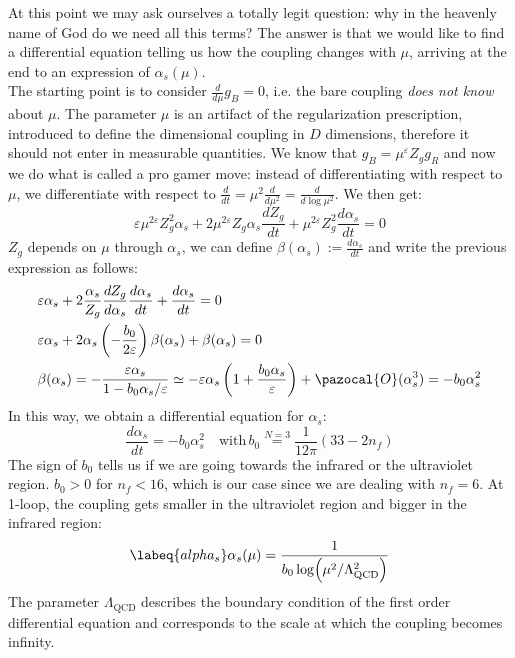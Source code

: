 \documentclass[../main.tex]{subfiles}
\begin{document}
At this point we may ask ourselves a totally legit question: why in the heavenly name of God do we need all this terms? The answer is that we would like to find a differential equation telling us how the coupling changes with $\mu$, arriving at the end to an expression of $\alpha_s(\mu)$.\\
The starting point is to consider $\frac{d}{d\mu}g_B=0$, i.e. the bare coupling \textit{does not know} about $\mu$. The parameter $\mu$ is an artifact of the regularization prescription, introduced to define the dimensional coupling in $D$ dimensions, therefore it should not enter in measurable quantities. We know that $g_B=\mu^\varepsilon Z_g g_R$ and now we do what is called a pro gamer move: instead of differentiating with respect to $\mu$, we differentiate with respect to $\frac{d}{dt}=\mu^2\frac{d}{d\mu^2}=\frac{d}{d\log\mu^2}$. We then get:
\[
\varepsilon\mu^{2\varepsilon}Z_g^2\alpha_s+2\mu^{2\varepsilon}Z_g\alpha_s\frac{dZ_g}{dt}+\mu^{2\varepsilon}Z_g^2\frac{d\alpha_s}{dt}=0
\]
$Z_g$ depends on $\mu$ through $\alpha_s$, we can define $\beta(\alpha_s):=\frac{d\alpha_s}{dt}$ and write the previous expression as follows:
\begin{align*}
&\varepsilon\alpha_s+2\frac{\alpha_s}{Z_g}\frac{dZ_g}{d\alpha_s}\frac{d\alpha_s}{dt}+\frac{d\alpha_s}{dt}=0\\
&\varepsilon\alpha_s+2\alpha_s\left(-\frac{b_0}{2\varepsilon}\right)\beta(\alpha_s)+\beta(\alpha_s)=0\\
&\beta(\alpha_s)=-\frac{\varepsilon\alpha_s}{1-b_0\alpha_s/\varepsilon}\simeq-\varepsilon\alpha_s\left(1+\frac{b_0\alpha_s}{\varepsilon}\right)+\pazocal{O}(\alpha_s^3)=-b_0\alpha_s^2
\end{align*}
In this way, we obtain a differential equation for $\alpha_s$:
\[
\frac{d\alpha_s}{dt}=-b_0\alpha_s^2 \quad \text{with}\,b_0\stackrel{N=3}{=}\frac{1}{12\pi}(33-2n_f)
\]
The sign of $b_0$ tells us if we are going towards the infrared or the ultraviolet region. $b_0>0$ for $n_f<16$, which is our case since we are dealing with $n_f=6$. At 1-loop, the coupling gets smaller in the ultraviolet region and bigger in the infrared region:
\begin{equation}
\labeq{alpha_s}
\alpha_s(\mu)=\frac{1}{b_0\log(\mu^2/\Lambda_{\text{QCD}}^2)}
\end{equation}
The parameter $\Lambda_{\text{QCD}}$ describes the boundary condition of the first order differential equation and corresponds to the scale at which the coupling becomes infinity.
\end{document}
